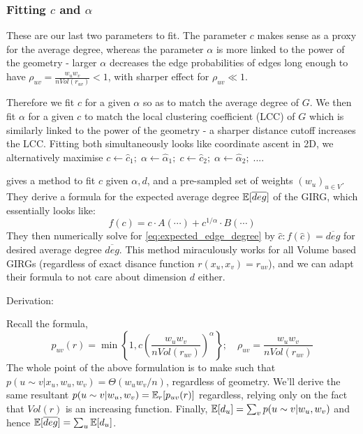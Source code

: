 \begin{comment}
None of this is quite true as $d_u$ aren't independent: doubly so, 1. due to weights, and 2. due to positions. 

Hence for a GIRG, $ \E[dd(x)]  \propto x^{-\tau}$ for $x_\text{min} < x \in \N$, a lower cutoff point. This cutoff is necessary not just because the pdf would blow up at $x=0$, but also because the power law behaviour may only hold for higher degrees. The GIRG 
\end{comment}


\subsubsection{Fitting $c$ and $\alpha$}
These are our last two parameters to fit.
The parameter $c$ makes sense as a proxy for the average degree, whereas the parameter $\alpha$ is more linked to the power of the geometry - larger $\alpha$ decreases the edge probabilities of edges long enough to have $\rho_{uv} = \frac{w_u w_v}{n Vol(r_{uv})} < 1$, with sharper effect for $\rho_{uv} \ll 1$.

Therefore we fit $c$ for a given $\alpha$ so as to match the average degree of $G$. We then fit $\alpha$ for a given $c$ to match the local clustering coefficient (LCC) of $G$ which is similarly linked to the power of the geometry - a sharper distance cutoff increases the LCC. Fitting both simultaneously looks like coordinate ascent in 2D, we alternatively maximise $c \gets \hat{c}_1;\; \alpha \gets \hat{\alpha}_1;\; c \gets \hat{c}_2;\; \alpha \gets \hat{\alpha}_2;\; ...$.

\cite{blasius2018towards} gives a method to fit $c$ given $\alpha, d$, and a pre-sampled set of weights $(w_u)_{u \in V}$. They derive a formula for the expected average degree $\mathbb{E}[\overline{deg}]$ of the GIRG, which essentially looks like:
\begin{equation}
    \label{eq:expected_edge_degree}
    f(c) = c \cdot A(\cdots) + c^{1/\alpha} \cdot B(\cdots)
\end{equation}
They then numerically solve for \cref{eq:expected_edge_degree} by $\hat{c}: f(\hat{c}) = \overline{deg}$ for desired average degree $\overline{deg}$. This method miraculously works for all Volume based GIRGs (regardless of exact disance function $r(x_u, x_v) = r_{uv}$), and we can adapt their formula to not care about dimension $d$ either.

Derivation:

Recall the formula,
\begin{equation}
    p_{uv}(r) = \min \left \{ 
        1,
        c \left (
            \frac{w_u w_v}{n Vol(r_{uv})}
        \right )^\alpha    
    \right \}; \quad \rho_{uv} = \frac{w_u w_v}{n Vol(r_{uv})}
\end{equation}
The whole point of the above formulation is to make such that $p(u \sim v | x_u, w_u, w_v) = \Theta(w_u w_v/n)$, regardless of geometry. We'll derive the same resultant $p(u \sim v | w_u, w_v) = \mathbb{E}_r[p_{uv}(r)]$ regardless, relying only on the fact that $Vol(r)$ is an increasing function. Finally, $\mathbb{E}[d_u] = \sum_v p(u \sim v | w_u, w_v)$ and hence $\mathbb{E}[\overline{deg}] = \sum_u \mathbb{E}[d_u]$.

